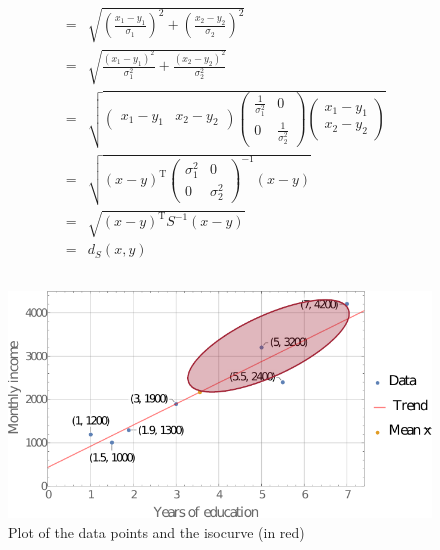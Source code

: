 \documentclass[DIN, pagenumber=false, fontsize=11pt, parskip=half]{scrartcl}
\begin{document}
\begin{enumerate}[label=\alph*)]
\begin{eqnarray*}
                    &=& \sqrt{{\left(\frac{x_1 - y_1}{\sigma_1}\right)}^2 + {\left(\frac{x_2 - y_2}{\sigma_2}\right)}^2} \\
                    &=& \sqrt{\frac{{(x_1 - y_1)}^2}{\sigma_1^2} + \frac{{(x_2 - y_2)}^2}{\sigma_2^2}} \\
                    &=& \sqrt{
                        \begin{pmatrix}x_1 - y_1 & x_2 - y_2 \end{pmatrix} 
                            \begin{pmatrix} \frac{1}{\sigma_1^2} & 0 \\ 0 & \frac{1}{\sigma_2^2} \end{pmatrix} 
                            \begin{pmatrix}x_1 - y_1 \\ x_2 - y_2 \end{pmatrix}}\\
                    &=& \sqrt{{(x-y)}^\text{T}
                            {\begin{pmatrix} \sigma_1^2 & 0 \\ 0 & \sigma_2^2 \end{pmatrix}}^{-1}
                            (x-y)} \\
                    &=& \sqrt{{(x-y)}^\text{T}
                            S^{-1}
                            (x-y)} \\
                    &=& d_S(x,y)
            \end{eqnarray*}
    \end{enumerate}

    \subsection{}
    \begin{figure}[H]
        \centering
        \includegraphics[width=\textwidth]{A3.pdf}
        \caption{Plot of the data points and the isocurve (in red)}
    \end{figure}

    \subsection{}
    
\end{document}
